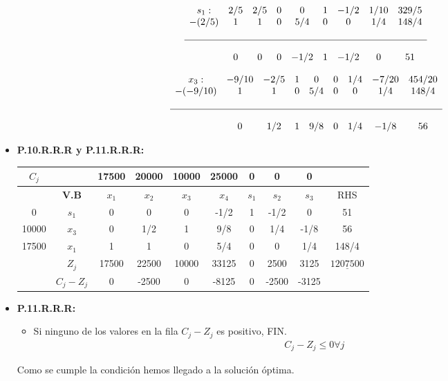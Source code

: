 \documentclass{templateNote}
\begin{document}
\begin{itemize}
    \begin{equation*}
        \begin{array}{ccccccccc}
            s_1: & 2/5 & 2/5 & 0 & 0 & 1 & -1/2 & 1/10 & 329/5 \\
            -(2/5) & 1 & 1 & 0 & 5/4 & 0 & 0 & 1/4 & 148/4 \\
            \\ \hline \\
            & 0 & 0 & 0 & -1/2 & 1 & -1/2 & 0 & 51
        \end{array}
    \end{equation*}
    
    \begin{equation*}
        \begin{array}{ccccccccc}
            x_3: & -9/10 & -2/5 & 1 & 0 & 0 & 1/4 & -7/20 & 454/20 \\
            -(-9/10) & 1 & 1 & 0 & 5/4 & 0 & 0 & 1/4 & 148/4 \\
            \\ \hline \\
            & 0 & 1/2 & 1 & 9/8 & 0 & 1/4 & -1/8 & 56
        \end{array}
    \end{equation*}

    \item \textbf{P.10.R.R.R y P.11.R.R.R:}
    \begin{center}
        \begin{tabular}{|c|c|c|c|c|c|c|c|c|c|}
            \hline
            $C_j$ & & 17500 & 20000 & 10000 & 25000 & 0 & 0 & 0 & \\ \hline
            & \textbf{V.B} & $x_1$ & $x_2$ & $x_3$ & $x_4$ & $s_1$ & $s_2$ & $s_3$ & RHS \\ \hline
            0 & $s_1$ & 0 & 0 & 0 & -1/2 & 1 & -1/2 & 0 & 51 \\
            10000 & $x_3$ & 0 & 1/2 & 1 & 9/8 & 0 & 1/4 & -1/8 & 56 \\
            17500 & $x_1$ & 1 & 1 & 0 & 5/4 & 0 & 0 & 1/4 & 148/4 \\ \hline
            & $Z_j$ & 17500 & 22500 & 10000 & 33125 & 0 & 2500 & 3125 & $\underline{1207500}$ \\ \hline
            & $C_j - Z_j$ & 0 & -2500 & 0 & -8125 & 0 & -2500 & -3125 & \\ \hline
        \end{tabular}
    \end{center}

    \item \textbf{P.11.R.R.R:}
    \begin{itemize}
        \item Si ninguno de los valores en la fila $C_j - Z_j$ es positivo, FIN.
        \begin{align*}
            C_j - Z_j \leq 0 \forall j
        \end{align*}
    \end{itemize}
    Como se cumple la condición hemos llegado a la solución óptima.
    

\end{itemize}
\end{document}
